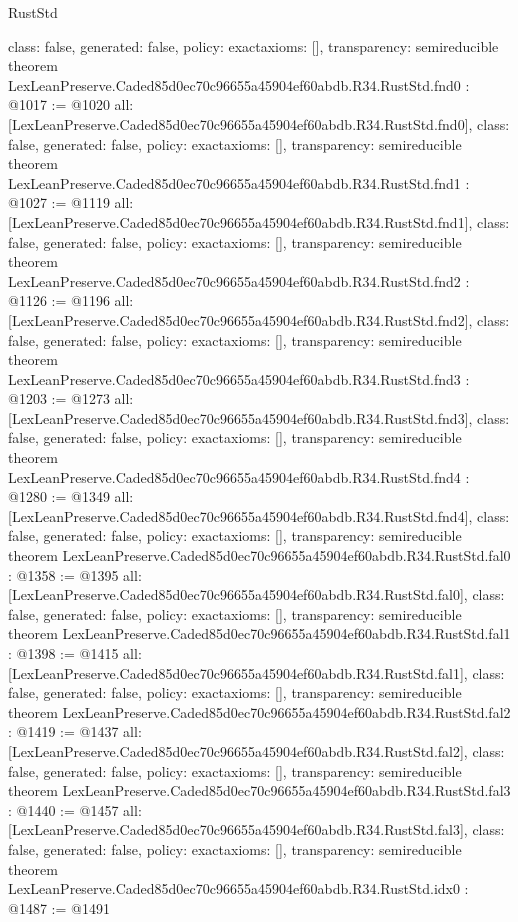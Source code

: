 \begin{lexlean}{RustStd}
\begin{coremodule}
{  class: false,
  generated: false,
  policy: exact{axioms: []},
  transparency: semireducible
}
theorem LexLeanPreserve.Caded85d0ec70c96655a45904ef60abdb.R34.RustStd.fnd0 : @1017 := @1020 {
  all: [LexLeanPreserve.Caded85d0ec70c96655a45904ef60abdb.R34.RustStd.fnd0],
  class: false,
  generated: false,
  policy: exact{axioms: []},
  transparency: semireducible
}
theorem LexLeanPreserve.Caded85d0ec70c96655a45904ef60abdb.R34.RustStd.fnd1 : @1027 := @1119 {
  all: [LexLeanPreserve.Caded85d0ec70c96655a45904ef60abdb.R34.RustStd.fnd1],
  class: false,
  generated: false,
  policy: exact{axioms: []},
  transparency: semireducible
}
theorem LexLeanPreserve.Caded85d0ec70c96655a45904ef60abdb.R34.RustStd.fnd2 : @1126 := @1196 {
  all: [LexLeanPreserve.Caded85d0ec70c96655a45904ef60abdb.R34.RustStd.fnd2],
  class: false,
  generated: false,
  policy: exact{axioms: []},
  transparency: semireducible
}
theorem LexLeanPreserve.Caded85d0ec70c96655a45904ef60abdb.R34.RustStd.fnd3 : @1203 := @1273 {
  all: [LexLeanPreserve.Caded85d0ec70c96655a45904ef60abdb.R34.RustStd.fnd3],
  class: false,
  generated: false,
  policy: exact{axioms: []},
  transparency: semireducible
}
theorem LexLeanPreserve.Caded85d0ec70c96655a45904ef60abdb.R34.RustStd.fnd4 : @1280 := @1349 {
  all: [LexLeanPreserve.Caded85d0ec70c96655a45904ef60abdb.R34.RustStd.fnd4],
  class: false,
  generated: false,
  policy: exact{axioms: []},
  transparency: semireducible
}
theorem LexLeanPreserve.Caded85d0ec70c96655a45904ef60abdb.R34.RustStd.fal0 : @1358 := @1395 {
  all: [LexLeanPreserve.Caded85d0ec70c96655a45904ef60abdb.R34.RustStd.fal0],
  class: false,
  generated: false,
  policy: exact{axioms: []},
  transparency: semireducible
}
theorem LexLeanPreserve.Caded85d0ec70c96655a45904ef60abdb.R34.RustStd.fal1 : @1398 := @1415 {
  all: [LexLeanPreserve.Caded85d0ec70c96655a45904ef60abdb.R34.RustStd.fal1],
  class: false,
  generated: false,
  policy: exact{axioms: []},
  transparency: semireducible
}
theorem LexLeanPreserve.Caded85d0ec70c96655a45904ef60abdb.R34.RustStd.fal2 : @1419 := @1437 {
  all: [LexLeanPreserve.Caded85d0ec70c96655a45904ef60abdb.R34.RustStd.fal2],
  class: false,
  generated: false,
  policy: exact{axioms: []},
  transparency: semireducible
}
theorem LexLeanPreserve.Caded85d0ec70c96655a45904ef60abdb.R34.RustStd.fal3 : @1440 := @1457 {
  all: [LexLeanPreserve.Caded85d0ec70c96655a45904ef60abdb.R34.RustStd.fal3],
  class: false,
  generated: false,
  policy: exact{axioms: []},
  transparency: semireducible
}
theorem LexLeanPreserve.Caded85d0ec70c96655a45904ef60abdb.R34.RustStd.idx0 : @1487 := @1491 {
}
\end{coremodule}
\end{lexlean}
